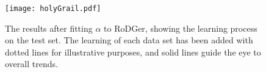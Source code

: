 \begin{figure}[H]
    \begin{center}
        \texttt{[image: holyGrail.pdf]}
        \caption[RoDGer Test Results]{The results after fitting $\alpha{}$ to RoDGer, showing the learning process on the test set. The learning of each data set has been added with dotted lines for illustrative purposes, and solid lines guide the eye to overall trends.}
        \label{fig:holyTrinity}
    \end{center}
\end{figure}
